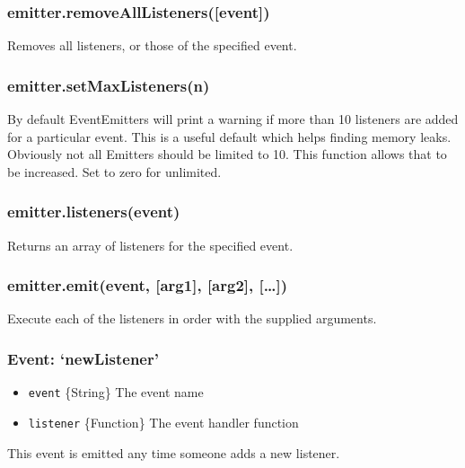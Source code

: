 \subsubsection{emitter.removeAllListeners({[}event{]})}

Removes all listeners, or those of the specified event.

\subsubsection{emitter.setMaxListeners(n)}

By default EventEmitters will print a warning if more than 10 listeners
are added for a particular event. This is a useful default which helps
finding memory leaks. Obviously not all Emitters should be limited to
10. This function allows that to be increased. Set to zero for
unlimited.

\subsubsection{emitter.listeners(event)}

Returns an array of listeners for the specified event.

\begin{Shaded}
\begin{Highlighting}[]
\NormalTok{(}\NormalTok{, } 
  \NormalTok{(}\NormalTok{);}
\NormalTok{\});}
\NormalTok{(}\NormalTok{(}\NormalTok{(}\NormalTok{))); }\CommentTok{// [ [Function] ]}
\end{Highlighting}
\end{Shaded}

\subsubsection{emitter.emit(event, {[}arg1{]}, {[}arg2{]},
{[}\ldots{}{]})}

Execute each of the listeners in order with the supplied arguments.

\subsubsection{Event: `newListener'}

\begin{itemize}
\item
  \texttt{event} \{String\} The event name
\item
  \texttt{listener} \{Function\} The event handler function
\end{itemize}

This event is emitted any time someone adds a new listener.
